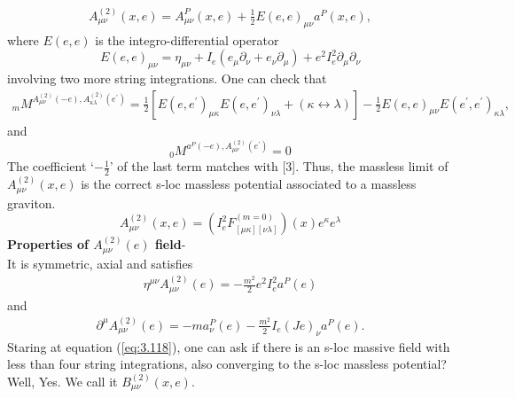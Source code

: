 \documentclass[12pt,a4paper]{article}
\numberwithin{equation}{section}
\begin{document}
\begin{align}\label{eq:3.118}
A_{\mu \nu}^{(2)}(x, e)=A^P_{\mu \nu}(x, e)+\frac{1}{2} E(e, e)_{\mu \nu} a^P(x, e),
\end{align} where
$E(e, e)$ is the integro-differential operator
$$
E(e, e)_{\mu \nu}=\eta_{\mu \nu}+I_{e}\left(e_{\mu} \partial_{\nu}+e_{\nu} \partial_{\mu}\right)+e^{2} I_{e}^{2} \partial_{\mu} \partial_{\nu}
$$
involving two more string integrations. One can check that 
$$
\begin{array}{l}
{}_m M^{A_{\mu \nu}^{(2)}(-e), A_{\kappa \lambda}^{(2)}\left(e^{\prime}\right)}=\frac{1}{2}\left[E\left(e, e^{\prime}\right)_{\mu \kappa} E\left(e, e^{\prime}\right)_{\nu \lambda}+(\kappa \leftrightarrow \lambda)\right]-\frac{1}{2} E(e, e)_{\mu\nu} E\left(e^{\prime}, e^{\prime}\right)_{\kappa \lambda},
\end{array}
$$
and 
$$
{}_0 M^{a^{P}(-e), A^{(2)}_{\mu \nu}\left(e^{\prime}\right)}=0
$$
The coefficient `$-\frac{1}{2}$' of the last term matches with [3]. Thus, the massless limit of $A^{(2)}_{\mu\nu}(x, e)$ is the correct s-loc massless potential associated to a massless graviton.
$$
A_{\mu \nu}^{(2)}(x, e)=\left(I_{e}^{2} F_{[\mu \kappa][\nu \lambda]}^{(m=0)}\right)(x) e^{\kappa} e^{\lambda}
$$
\textbf{\textcolor{blue!50!black}{Properties of $A_{\mu \nu}^{(2)}(e)$ field}}-\\
It is symmetric, axial and satisfies 
\begin{align}\label{eq:3.1}
\eta^{\mu \nu} A_{\mu \nu}^{(2)}(e)=-\frac{m^{2}}{2} e^{2} I_{e}^{2} a^P(e)
\end{align} and 
\begin{align}\label{eq:3.2}
\partial^{\mu} A_{\mu \nu}^{(2)}(e)=-m a^P_{\nu}(e)-
\frac{m^{2}}{2} I_{e}(J e)_{\nu} a^P(e).
\end{align}
Staring at equation (\ref{eq:3.118}), one can ask if there is an s-loc massive field with less than four string integrations, also converging to the s-loc massless potential? Well, Yes. We call it $B^{(2)}_{\mu\nu}(x,e)$.
\end{document}
